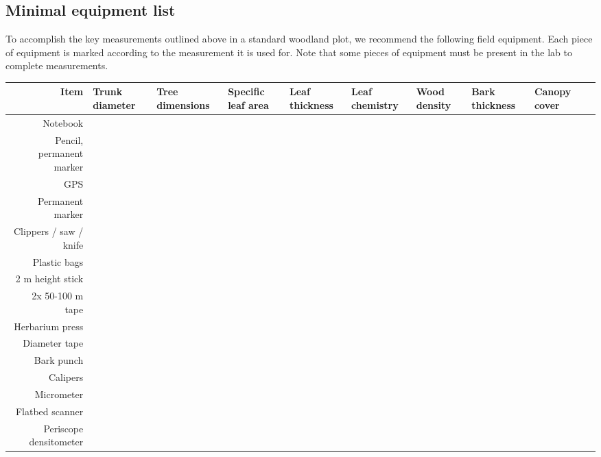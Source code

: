 \documentclass[11pt,a4paper]{article}
\newcommand{\C}{\checkmark}
\begin{document}
\begin{landscape}
\section{Minimal equipment list}

To accomplish the key measurements outlined above in a standard woodland plot, we recommend the following field equipment. Each piece of equipment is marked according to the measurement it is used for. Note that some pieces of equipment must be present in the lab to complete measurements.

\begin{table}[H]
\begin{tabular}{r|>{\centering\arraybackslash}m{2cm}>{\centering\arraybackslash}m{2cm}>{\centering\arraybackslash}m{2cm}>{\centering\arraybackslash}m{2cm}>{\centering\arraybackslash}m{2cm}>{\centering\arraybackslash}m{2cm}>{\centering\arraybackslash}m{2cm}>{\centering\arraybackslash}m{2cm}>{\centering\arraybackslash}m{2cm}}
    \rowcolor{gray!50}
	\hline
	Item & Trunk diameter & Tree dimensions & Specific leaf area & Leaf thickness & Leaf chemistry & Wood density & Bark thickness & Canopy cover \\
	\hline
	Notebook                 & \C & \C & \C & \C & \C & \C & \C & \C \\
	Pencil, permanent marker & \C & \C & \C & \C & \C & \C & \C & \C \\
	GPS                      & \C & \C & \C & \C & \C & \C & \C & \C \\
	Permanent marker         &    &    & \C & \C & \C & \C & \C &    \\
	Clippers / saw / knife   &    &    & \C & \C & \C & \C & \C &    \\
	Plastic bags             &    &    &    &    & \C & \C & \C &    \\
	2 m height stick         & \C & \C &    &    &    & \C & \C &    \\
	2x 50-100 m tape         & \C & \C &    &    &    &    &    & \C \\
	Herbarium press          &    &    & \C & \C &    &    &    &    \\
	Diameter tape            & \C &    &    &    &    & \C & \C &    \\
	Bark punch               &    &    &    &    &    & \C & \C &    \\
	Calipers                 &    &    & \C &    &    & \C & \C &    \\
	Micrometer               &    &    &    & \C &    &    &    &    \\
	Flatbed scanner          &    &    & \C &    &    &    &    &    \\
	Periscope densitometer   &    &    &    &    &    &    &    & \C \\
	\hline
\end{tabular}
\end{table}

\end{landscape}


\printbibliography
\end{document}
